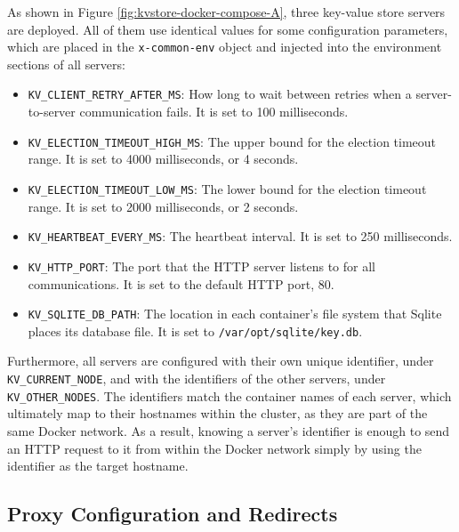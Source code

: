 As shown in Figure \ref{fig:kvstore-docker-compose-A}, three key-value store servers are deployed. All of them use identical values for some configuration parameters, which are placed in the \lstinline|x-common-env| object and injected into the environment sections of all servers:
\begin{itemize}
  \item \lstinline{KV_CLIENT_RETRY_AFTER_MS}: How long to wait between retries when a server-to-server communication fails. It is set to 100 milliseconds.
  \item \lstinline{KV_ELECTION_TIMEOUT_HIGH_MS}: The upper bound for the election timeout range. It is set to 4000 milliseconds, or 4 seconds.
  \item \lstinline{KV_ELECTION_TIMEOUT_LOW_MS}: The lower bound for the election timeout range. It is set to 2000 milliseconds, or 2 seconds.
  \item \lstinline{KV_HEARTBEAT_EVERY_MS}: The heartbeat interval. It is set to 250 milliseconds.
  \item \lstinline{KV_HTTP_PORT}: The port that the HTTP server listens to for all communications. It is set to the default HTTP port, 80.
  \item \lstinline{KV_SQLITE_DB_PATH}: The location in each container's file system that Sqlite places its database file. It is set to \lstinline{/var/opt/sqlite/key.db}.
\end{itemize}

Furthermore, all servers are configured with their own unique identifier, under \lstinline{KV_CURRENT_NODE}, and with the identifiers of the other servers, under \lstinline{KV_OTHER_NODES}. The identifiers match the container names of each server, which ultimately map to their hostnames within the cluster, as they are part of the same Docker network. As a result, knowing a server's identifier is enough to send an HTTP request to it from within the Docker network simply by using the identifier as the target hostname.

\subsection{Proxy Configuration and Redirects}

